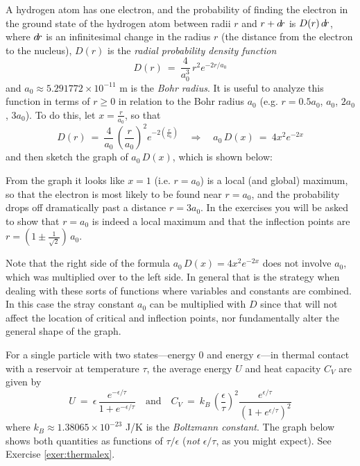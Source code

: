 \begin{exmp}\label{exmp:graph5}
\noindent A hydrogen atom has one electron, and the probability of finding the
electron in the ground state of the hydrogen atom between radii $r$ and $r+d\!r$
is $D(r)\,d\!r$, where $d\!r$ is an infinitesimal change in the radius $r$ (the
distance from the electron to the nucleus), $D(r)$ is the \emph{radial
probability density function}
\[
D(r) ~=~ \frac{4}{a_0^3}\,r^2 e^{-2r/a_0}
\]
and $a_0 \approx 5.291772 \times 10^{-11}$ m is the \emph{Bohr radius}. It is useful to analyze this function in terms of $r \ge 0$
in relation to the Bohr radius $a_0$ (e.g.
$r= 0.5a_0$, $a_0$, $2a_0$, $3a_0$). To do this, let $x = \frac{r}{a_0}$, so that
\[
D(r) ~=~ \frac{4}{a_0}\,\left(\frac{r}{a_0}\right)^2 e^{-2\left(\frac{r}{a_0}\right)}
\quad\Rightarrow\quad
a_0\,D(x) ~=~ 4x^2 e^{-2x}
\]
and then sketch the graph of $a_0\,D(x)$, which is shown below:

\begin{center}

\end{center}

\noindent From the graph it looks like $x=1$ (i.e. $r = a_0$) is a local (and
global) maximum, so that the electron is most likely to be found near
$r = a_0$, and the probability drops off dramatically past a distance
$r = 3a_0$. In the exercises you will be asked to show that $r = a_0$ is indeed
a local maximum and that the inflection points are
$r = \left(1 \pm \frac{1}{\sqrt{2}}\right)\,a_0$.\vspace{2mm}

\par\noindent Note that the right side of the formula
$a_0\,D(x) = 4x^2 e^{-2x}$ does not involve $a_0$, which was multiplied
over to the left side. In general that is the strategy when dealing with
these sorts of functions where variables and constants are combined. In this
case the stray constant $a_0$ can be multiplied with $D$ since that will not
affect the location of critical and inflection points, nor fundamentally alter
the general shape of the graph.
\end{exmp}
\divider
\newpage
\begin{exmp}\label{exmp:thermalex}
\noindent For a single particle with two states---energy 0 and energy
$\epsilon$---in thermal contact with a reservoir at temperature $\tau$, the
average energy $U$ and heat capacity $C_V$ are given by
\[
U ~=~ \epsilon\,\frac{e^{-\epsilon/\tau}}{1 + e^{-\epsilon/\tau}} \quad\text{and}\quad
C_V ~=~ k_B\,\left(\frac{\epsilon}{\tau}\right)^2 \frac{e^{\epsilon/\tau}}{\left(1 + e^{\epsilon/\tau}\right)^2}
\]
where $k_B \approx 1.38065 \times 10^{\text{$-$}23}$ J/K is the
\emph{Boltzmann constant}. The graph below shows both quantities as functions
of $\tau/\epsilon$ (\emph{not} $\epsilon/\tau$, as you might
expect). See Exercise \ref{exer:thermalex}.\vspace{-3mm}

\begin{center}

\end{center}
\end{exmp}\vspace{-4mm}
